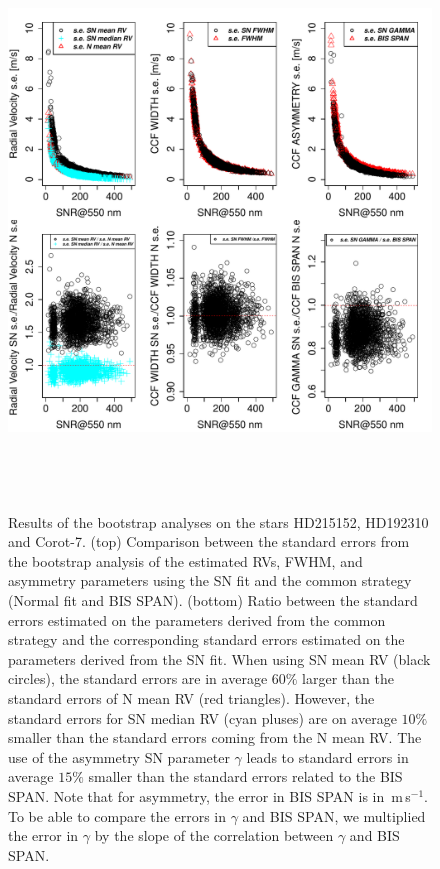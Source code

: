 \documentclass{aa}
\def\ms{\hbox{\,m\,s$^{-1}$}}         %
\begin{document}
\begin{figure}[htbp]
\begin{center}
\includegraphics[height = 6in]{[5]Errors_vs_SNR_all_stars.pdf} 
   \caption{Results of the bootstrap analyses on the stars HD215152, HD192310 and Corot-7. (top) Comparison between the standard errors from the bootstrap analysis of the estimated RVs, FWHM, and asymmetry parameters using the SN fit and the common strategy (Normal fit and BIS SPAN). (bottom) Ratio between the standard errors estimated on the parameters derived from the common strategy and the corresponding standard errors estimated on the parameters derived from the SN fit. When using SN mean RV (black circles), the standard errors are in average $60\%$ larger than the standard errors of N mean RV (red triangles). However, the standard errors for SN median RV (cyan pluses) are on average $10\%$ smaller than the standard errors coming from the N mean RV. 
   The use of the asymmetry SN parameter $\gamma$ leads to standard errors in average $15\%$ smaller than the standard errors related to the BIS SPAN. Note that for asymmetry, the error in BIS SPAN is in \ms. To be able to compare the errors in $\gamma$ and BIS SPAN, we multiplied the error in $\gamma$ by the slope of the correlation between $\gamma$ and BIS SPAN.}
   \label{fig:se}
\end{center}
\end{figure}
\end{document}
